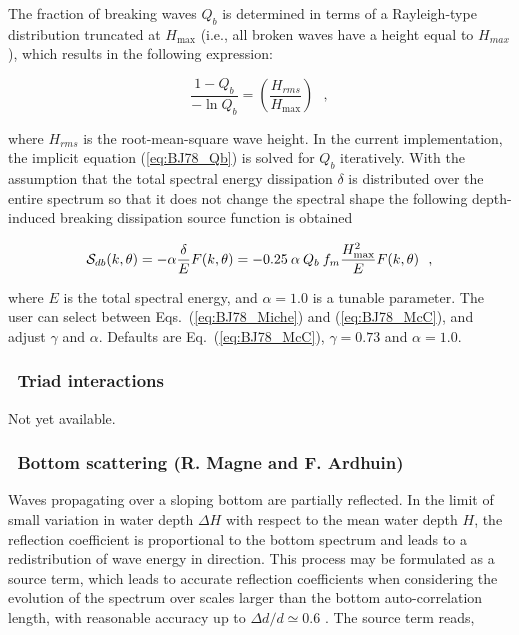 The fraction of breaking waves $Q_b$ is determined in terms of a Rayleigh-type
distribution truncated at $H_{\max}$ (i.e., all broken waves have a height
equal to $H_{max}$), which results in the following expression:


\begin{equation}
\frac{1 - Q_b}{-\ln Q_b} = \left ( \frac{H_{rms}}{H_{\max}} \right )
\:\:\: , \label{eq:BJ78_Qb}
\end{equation}

\noindent
where $H_{rms}$ is the root-mean-square wave height. In the current
implementation, the implicit equation (\ref{eq:BJ78_Qb}) is solved for $Q_b$
iteratively. With the assumption that the total spectral energy dissipation
$\delta$ is distributed over the entire spectrum so that it does not change
the spectral shape \citep{art:EB96} the following depth-induced breaking
dissipation source function is obtained


\begin{equation}
{\cal S}_{db} (k,\theta) = - \alpha \frac{\delta}{E} F(k,\theta)
       = - 0.25 \: \alpha \: Q_b \: f_m \frac{H_{\max}^2}{E} F(k,\theta)
\:\:\: , \label{eq:BJ78}
\end{equation}

\noindent
where $E$ is the total spectral energy, and $\alpha = 1.0$ is a tunable
parameter. The user can select between Eqs.~(\ref{eq:BJ78_Miche}) and
(\ref{eq:BJ78_McC}), and adjust $\gamma$ and $\alpha$. Defaults are
Eq.~(\ref{eq:BJ78_McC}), $\gamma = 0.73$ and $\alpha = 1.0$.


\vsssub
\subsubsection{~Triad interactions} \label{sec:triad}
\vsssub

Not yet available.


\vsssub
\subsubsection{~Bottom scattering \hfill {\rm (R. Magne and F. Ardhuin)}}
\label{sec:bscat}
\vsssub

Waves propagating over a sloping bottom are partially reflected.  In the limit
of small variation in water depth $\Delta H$ with respect to the mean water
depth $H$, the reflection coefficient is proportional to the bottom spectrum
\cite{art:Kre49} and leads to a redistribution of wave energy in direction.
This process may be formulated as a source term, which leads to accurate
reflection coefficients when considering the evolution of the spectrum over
scales larger than the bottom auto-correlation length, with reasonable
accuracy up to $\Delta d / d \simeq 0.6$ \citep{art:AM07}. The source term
reads,

